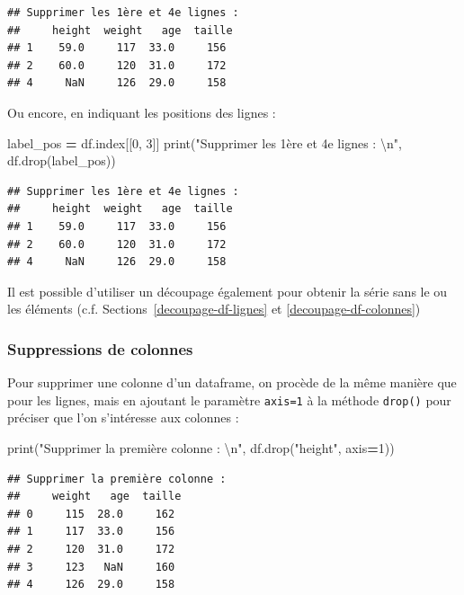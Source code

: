 \documentclass[
  12pt,
]{book}
\newenvironment{Shaded}{\begin{snugshade}}{\end{snugshade}}
\newcommand{\BuiltInTok}[1]{#1}
\newcommand{\CharTok}[1]{\textcolor[rgb]{0.31,0.60,0.02}{#1}}
\newcommand{\DecValTok}[1]{\textcolor[rgb]{0.00,0.00,0.81}{#1}}
\newcommand{\NormalTok}[1]{#1}
\newcommand{\OperatorTok}[1]{\textcolor[rgb]{0.81,0.36,0.00}{\textbf{#1}}}
\newcommand{\StringTok}[1]{\textcolor[rgb]{0.31,0.60,0.02}{#1}}
\numberwithin{equation}{section}
\numberwithin{countremarque}{section}
\begin{document}
\begin{lstlisting}
## Supprimer les 1ère et 4e lignes :  
##     height  weight   age  taille
## 1    59.0     117  33.0     156
## 2    60.0     120  31.0     172
## 4     NaN     126  29.0     158
\end{lstlisting}

Ou encore, en indiquant les positions des lignes :

\begin{Shaded}
\begin{Highlighting}[]
\NormalTok{label\_pos }\OperatorTok{=}\NormalTok{ df.index[[}\DecValTok{0}\NormalTok{, }\DecValTok{3}\NormalTok{]]}
\BuiltInTok{print}\NormalTok{(}\StringTok{"Supprimer les 1ère et 4e lignes :  }\CharTok{\textbackslash{}n}\StringTok{"}\NormalTok{, df.drop(label\_pos))}
\end{Highlighting}
\end{Shaded}

\begin{lstlisting}
## Supprimer les 1ère et 4e lignes :  
##     height  weight   age  taille
## 1    59.0     117  33.0     156
## 2    60.0     120  31.0     172
## 4     NaN     126  29.0     158
\end{lstlisting}

Il est possible d'utiliser un découpage également pour obtenir la série sans le ou les éléments (c.f. Sections~\ref{decoupage-df-lignes} et \ref{decoupage-df-colonnes})

\subsubsection{Suppressions de colonnes}\label{suppressions-de-colonnes}

Pour supprimer une colonne d'un dataframe, on procède de la même manière que pour les lignes, mais en ajoutant le paramètre \texttt{axis=1} à la méthode \texttt{drop()} pour préciser que l'on s'intéresse aux colonnes :

\begin{Shaded}
\begin{Highlighting}[]
\BuiltInTok{print}\NormalTok{(}\StringTok{"Supprimer la première colonne :  }\CharTok{\textbackslash{}n}\StringTok{"}\NormalTok{, df.drop(}\StringTok{"height"}\NormalTok{, axis}\OperatorTok{=}\DecValTok{1}\NormalTok{))}
\end{Highlighting}
\end{Shaded}

\begin{lstlisting}
## Supprimer la première colonne :  
##     weight   age  taille
## 0     115  28.0     162
## 1     117  33.0     156
## 2     120  31.0     172
## 3     123   NaN     160
## 4     126  29.0     158
\end{lstlisting}
\end{document}
